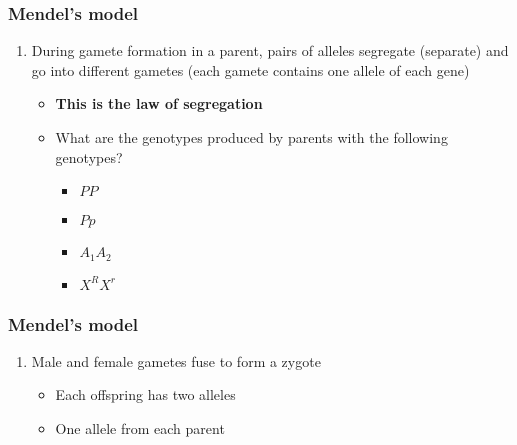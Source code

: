 \begin{frame}[t]
    \frametitle{Mendel's model}
    \begin{enumerate}
        \addtocounter{enumi}{4}
        \item During gamete formation in a parent, pairs of alleles segregate
            (separate) and go into different gametes (each gamete contains one
            allele of each gene)
            \begin{itemize}
                \item \textbf{This is the law of segregation}
                \item<2-> What are the  genotypes produced
                    by parents with the following genotypes?
                    \begin{itemize}
                        \item<2-> $PP$ \hspace{9mm}
                            \vspace{5mm}
                        \item<2-> $Pp$ \hspace{10mm}
                            \vspace{5mm}
                        \item<2-> $A_{1}A_{2}$ \hspace{6mm}
                            \vspace{5mm}
                        \item<2-> $X^{R}X^{r}$ \hspace{5mm}
                    \end{itemize}
            \end{itemize}
    \end{enumerate}
\end{frame}

\begin{frame}[t]
    \frametitle{Mendel's model}
    \begin{enumerate}
        \addtocounter{enumi}{5}
        \item Male and female gametes fuse to form a zygote
            \begin{itemize}
                \item Each offspring has two alleles
                \item One allele from each parent
            \end{itemize}
    \end{enumerate}
\end{frame}

